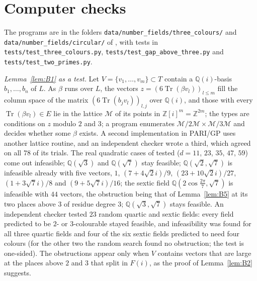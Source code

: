 \documentclass[11pt,a4paper]{amsart}
\theoremstyle{remark}
\newcommand{\Q}{\mathbb{Q}}
\newcommand{\Z}{\mathbb{Z}}
\newcommand{\Tr}{\operatorname{Tr}}
\begin{document}
\section{Computer checks}\label{sec:checks}

The programs are in the folders \nolinkurl{data/number_fields/three_colours/} and
\nolinkurl{data/number_fields/circular/} of \cite{Repo}, with tests in \nolinkurl{tests/test_three_colours.py},
\nolinkurl{tests/test_gap_above_three.py} and \nolinkurl{tests/test_two_primes.py}.

\emph{Lemma~\ref{lem:B1} as a test.} Let $V=\{v_1,\dots,v_m\}\subset T$ contain a $\Q(i)$-basis $b_1,\dots,b_n$ of
$L$. As $\beta$ runs over $L$, the vectors $z=(6\Tr(\beta v_l))_{l\le m}$ fill the column space of the matrix
$(6\Tr(b_jv_l))_{l,j}$ over $\Q(i)$, and those with every $\Tr(\beta v_l)\in E$ lie in the lattice $\mathcal M$ of its
points in $\Z[i]^m=\Z^{2m}$; the types are conditions on $z$ modulo $2$ and $3$; a program
enumerates $\mathcal M/2\mathcal M\times\mathcal M/3\mathcal M$ and decides whether some $\beta$ exists. A second implementation in PARI/GP
\cite{PARI} uses another lattice routine, and an independent checker wrote a third, which agreed on all $78$ of its trials. The
real quadratic cases of \cite{FC} tested ($d=11$, $23$, $35$, $47$, $59$) come out infeasible; $\Q(\sqrt3)$ and $\Q(\sqrt7)$ stay feasible;
$\Q(\sqrt2,\sqrt7)$ is infeasible already with five vectors, $1$, $(7+4\sqrt2i)/9$, $(23+10\sqrt2i)/27$,
$(1+3\sqrt7i)/8$ and $(9+5\sqrt7i)/16$; the sextic field $\Q(2\cos\frac{2\pi}7,\sqrt7)$ is infeasible with $44$
vectors, the obstruction being that of Lemma~\ref{lem:B5} at its two places above $3$ of residue degree $3$;
$\Q(\sqrt3,\sqrt7)$ stays feasible. An independent checker tested $23$ random quartic and sextic fields: every field predicted to
be $2$- or $3$-colourable stayed feasible, and infeasibility was found for all three quartic fields and four of the
six sextic fields predicted to need four colours (for the other two the random search found no obstruction; the
test is one-sided). The obstructions appear only when $V$ contains vectors that are large at the places above $2$
and $3$ that split in $F(i)$, as the proof of Lemma~\ref{lem:B2} suggests.
\end{document}
